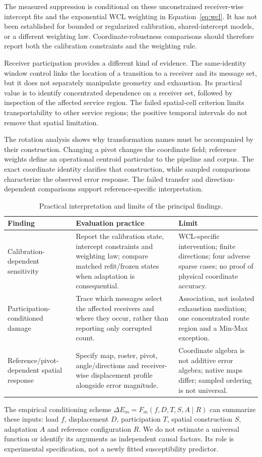 \documentclass[11pt,a4paper]{article}
\begin{document}
The measured suppression is conditional on these unconstrained receiver-wise intercept fits and the exponential WCL weighting in Equation~\ref{eq:wcl}. It has not been established for bounded or regularized calibration, shared-intercept models, or a different weighting law. Coordinate-robustness comparisons should therefore report both the calibration constraints and the weighting rule.

Receiver participation provides a different kind of evidence. The same-identity window control links the location of a transition to a receiver and its message set, but it does not separately manipulate geometry and exhaustion. Its practical value is to identify concentrated dependence on a receiver set, followed by inspection of the affected service region. The failed spatial-cell criterion limits transportability to other service regions; the positive temporal intervals do not remove that spatial limitation.

The rotation analysis shows why transformation names must be accompanied by their construction. Changing a pivot changes the coordinate field; reference weights define an operational centroid particular to the pipeline and corpus. The exact coordinate identity clarifies that construction, while sampled comparisons characterize the observed error response. The failed transfer and direction-dependent comparisons support reference-specific interpretation.

\begin{table}[htbp]\centering\small
\caption{Practical interpretation and limits of the principal findings.}\label{tab:interpretation}
\begin{tabularx}{\textwidth}{YYY}\toprule Finding & Evaluation practice & Limit\\\midrule
Calibration-dependent sensitivity & Report the calibration state, intercept constraints and weighting law; compare matched refit/frozen states when adaptation is consequential. & WCL-specific intervention; finite directions; four adverse sparse cases; no proof of physical coordinate accuracy.\\
Participation-conditioned damage & Trace which messages select the affected receivers and where they occur, rather than reporting only corrupted count. & Association, not isolated exhaustion mediation; one concentrated route region and a Min-Max exception.\\
Reference/pivot-dependent spatial response & Specify map, roster, pivot, angle/directions and receiver-wise displacement profile alongside error magnitude. & Coordinate algebra is not additive error algebra; native maps differ; sampled ordering is not universal.\\\bottomrule\end{tabularx}
\end{table}
The empirical conditioning scheme $\Delta E_m=F_m(f,D,T,S,A\mid R)$ can summarize these inputs: load $f$, displacement $D$, participation $T$, spatial construction $S$, adaptation $A$ and reference configuration $R$. We do not estimate a universal function or identify its arguments as independent causal factors. Its role is experimental specification, not a newly fitted susceptibility predictor.
\end{document}

